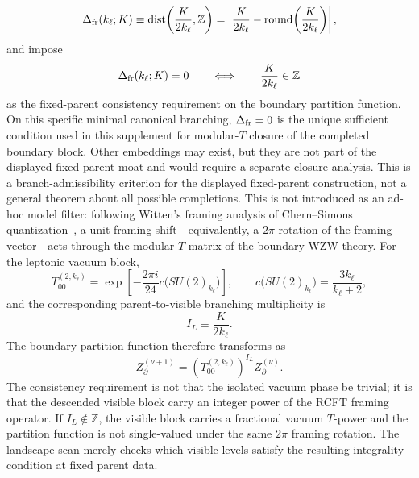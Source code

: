 \documentclass[11pt]{article}
\begin{document}
\begin{equation}
 \Delta_{\rm fr}(k_{\ell};K)
 \equiv
 \operatorname{dist}\!\left(\frac{K}{2k_{\ell}},\mathbb Z\right)
 =
 \left| \frac{K}{2k_{\ell}} - \operatorname{round}\!\left(\frac{K}{2k_{\ell}}\right) \right|,
\end{equation}
and impose
\begin{equation}
 \Delta_{\rm fr}(k_{\ell};K)=0
 \qquad\Longleftrightarrow\qquad
 \frac{K}{2k_{\ell}}\in\mathbb Z
\end{equation}
as the fixed-parent consistency requirement on the boundary partition function. On this specific minimal canonical branching, $\Delta_{\rm fr}=0$ is the unique sufficient condition used in this supplement for modular-$T$ closure of the completed boundary block. Other embeddings may exist, but they are not part of the displayed fixed-parent moat and would require a separate closure analysis. This is a branch-admissibility criterion for the displayed fixed-parent construction, not a general theorem about all possible completions.
This is not introduced as an ad-hoc model filter: following Witten's framing
analysis of Chern--Simons quantization~\cite{witten1989}, a unit framing
shift---equivalently, a $2\pi$ rotation of the framing vector---acts through
the modular-$T$ matrix of the boundary WZW theory. For the leptonic vacuum
block,
\begin{equation}
 T_{00}^{(2,k_{\ell})}
 =
 \exp\!\left[-\frac{2\pi i}{24}c\bigl(SU(2)_{k_{\ell}}\bigr)\right],
 \qquad
 c\bigl(SU(2)_{k_{\ell}}\bigr)=\frac{3k_{\ell}}{k_{\ell}+2},
\end{equation}
and the corresponding parent-to-visible branching multiplicity is
\begin{equation}
 I_L\equiv\frac{K}{2k_{\ell}}.
\end{equation}
The boundary partition function therefore transforms as
\begin{equation}
 Z_{\partial}^{(\nu+1)}
 =
 \left(T_{00}^{(2,k_{\ell})}\right)^{I_L}Z_{\partial}^{(\nu)}.
\end{equation}
The consistency requirement is not that the isolated vacuum phase be trivial;
it is that the descended visible block carry an integer power of the RCFT
framing operator. If $I_L\notin\mathbb Z$, the visible block carries a
fractional vacuum $T$-power and the partition function is not single-valued
under the same $2\pi$ framing rotation. The landscape scan merely checks which
visible levels satisfy the resulting integrality condition at fixed parent
data.
\end{document}

